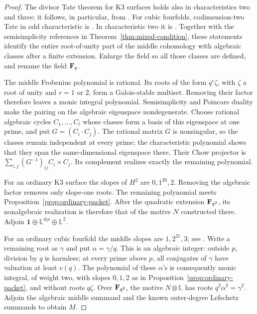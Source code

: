 \begin{proof}
The divisor Tate theorem for K3 surfaces holds also in
characteristics two and three; it follows, in particular, from
\citet[Theorem 1.5, p.~3, and Lemma 10.3, pp.~53--54]{IIK2021}.
For cubic fourfolds, codimension-two Tate in odd characteristic is
\citet[Theorem 5.14(3), author preprint p.~27]{MadapusiPera2015}.
In characteristic two it is
\citet[Theorem 4.10, author-hosted journal text p.~20]{AuelEtAl2025}.
Together with the semisimplicity references in
Theorem~\ref{thm:mixed-condition}, these statements identify the
entire root-of-unity part of the middle cohomology with algebraic
classes after a finite extension. Enlarge the field so all those
classes are defined, and rename the field $\mathbf F_q$.

The middle Frobenius polynomial is rational. Its roots of the
form $q^r\zeta$, with $\zeta$ a root of unity and $r=1$ or $2$,
form a Galois-stable multiset. Removing their factor therefore
leaves a monic integral polynomial. Semisimplicity and Poincare
duality make the pairing on the algebraic eigenspace nondegenerate.
Choose rational algebraic cycles $C_1,\ldots,C_t$ whose classes
form a basis of this eigenspace at one prime, and put
$G=(C_i\cdot C_j)$. The rational matrix $G$ is nonsingular, so
the classes remain independent at every prime; the characteristic
polynomial shows that they span the same-dimensional eigenspace
there. Their Chow projector is
$\sum_{i,j}(G^{-1})_{ij}C_i\times C_j$.
Its complement realizes exactly the remaining polynomial.

For an ordinary K3 surface the slopes of $H^2$ are
$0,1^{20},2$. Removing the algebraic factor removes only slope-one
roots. The remaining polynomial meets
Proposition~\ref{prop:ordinary-packet}. After the quadratic
extension $\mathbf F_{q^2}$, its nonalgebraic realization is therefore
that of the motive $N$ constructed there. Adjoin
$\mathbf1\oplus\mathbb L^{\oplus\rho}\oplus\mathbb L^2$.

For an ordinary cubic fourfold the middle slopes are
$1,2^{21},3$; see \citet[\S4, discussion after Remark 4.1,
author preprint p.~6]{Zarhin2004}.
Write a remaining root as $\gamma$ and put $\alpha=\gamma/q$.
This is an algebraic integer: outside $p$, division by $q$ is
harmless; at every prime above $p$, all conjugates of $\gamma$
have valuation at least $v(q)$. The polynomial of these
$\alpha$'s is consequently monic integral, of weight two, with
slopes $0,1,2$ as in Proposition~\ref{prop:ordinary-packet}, and
without roots $q\zeta$. Over $\mathbf F_{q^2}$, the motive
$N\otimes\mathbb L$ has roots $q^2\alpha^2=\gamma^2$.
Adjoin the algebraic middle summand and the known outer-degree
Lefschetz summands to obtain $M$.


\end{proof}
